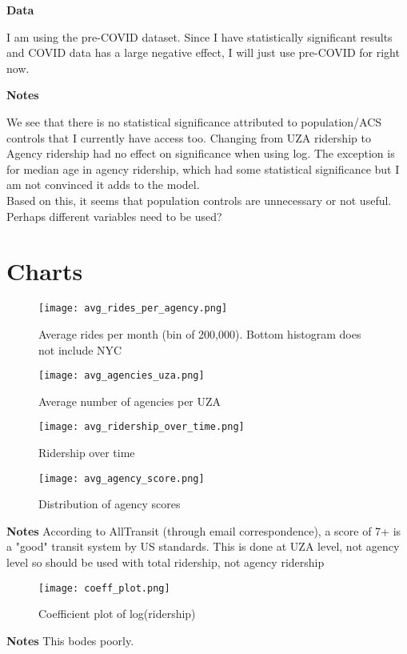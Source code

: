 \documentclass [11pt]{article}
\begin{document}
\textbf{Data}

I am using the pre-COVID dataset. Since I have statistically significant results and COVID data has a large negative effect, I will just use pre-COVID for right now.

\textbf{Notes}

We see that there is no statistical significance attributed to population/ACS controls that I currently have access too. Changing from UZA ridership to Agency ridership had no effect on significance when using log. The exception is for median age in agency ridership, which had some statistical significance but I am not convinced it adds to the model.\\
Based on this, it seems that population controls are unnecessary or not useful. Perhaps different variables need to be used?

\newpage
\section*{Charts}
\begin{figure}[H]
    \centering
    \texttt{[image: avg\_rides\_per\_agency.png]} %
    \caption{Average rides per month (bin of 200,000). Bottom histogram does not include NYC}
\end{figure}
\begin{figure}[H]
    \centering
    \texttt{[image: avg\_agencies\_uza.png]} %
    \caption{Average number of agencies per UZA}
\end{figure}
\begin{figure}[H]
    \centering
    \texttt{[image: avg\_ridership\_over\_time.png]} %
    \caption{Ridership over time}
\end{figure}
\begin{figure}[H]
    \centering
    \texttt{[image: avg\_agency\_score.png]} %
    \caption{Distribution of agency scores}
\end{figure}
\textbf{Notes}
According to AllTransit (through email correspondence), a score of 7+ is a "good" transit system by US standards. This is done at UZA level, not agency level so should be used with total ridership, not agency ridership
\begin{figure}[H]
    \centering
    \texttt{[image: coeff\_plot.png]} %
    \caption{Coefficient plot of log(ridership)}
\end{figure}
\textbf{Notes}
This bodes poorly.
\end{document}
